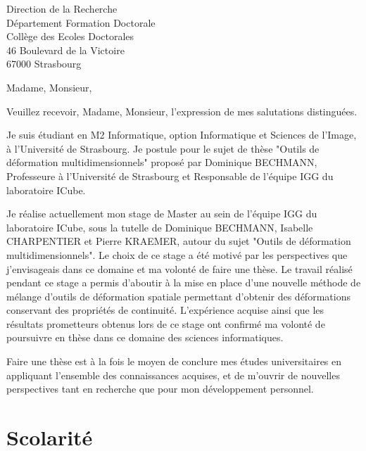 \documentclass[11pt,a4paper,sans]{moderncv}
\begin{document}
{Direction de la Recherche\\
Département Formation Doctorale\\
Collège des Ecoles Doctorales\\
46 Boulevard de la Victoire\\
67000 Strasbourg}
\date{\mydateformat\today}
\opening{Madame, Monsieur,}
\closing{Veuillez recevoir, Madame, Monsieur, l'expression de mes salutations
distinguées.}
\makelettertitle

Je suis étudiant en M2 Informatique, option Informatique et Sciences de l'Image,
à l'Université de Strasbourg. Je postule pour le sujet de thèse "Outils de
déformation multidimensionnels" proposé par Dominique BECHMANN, Professeure à
l'Université de Strasbourg et Responsable de l'équipe IGG du laboratoire ICube.

Je réalise actuellement mon stage de Master au sein de l'équipe IGG du
laboratoire ICube, sous la tutelle de Dominique BECHMANN, Isabelle CHARPENTIER
et Pierre KRAEMER, autour du sujet "Outils de déformation multidimensionnels".
Le choix de ce stage a été motivé par les perspectives que j'envisageais dans
ce domaine et ma volonté de faire une thèse. Le travail réalisé pendant ce
stage a permis d'aboutir à la mise en place d'une nouvelle méthode de mélange
d'outils de déformation spatiale permettant d'obtenir des déformations
conservant des propriétés de continuité. L'expérience acquise ainsi que les 
résultats prometteurs obtenus lors de ce stage ont confirmé ma volonté de
poursuivre en thèse dans ce domaine des sciences informatiques.

Faire une thèse est à la fois le moyen de conclure mes études universitaires en
appliquant l'ensemble des connaissances acquises, et de m'ouvrir de nouvelles
perspectives tant en recherche que pour mon développement personnel.

\makeletterclosing

\clearpage

\makecvtitle

\section{Scolarité}
\end{document}
